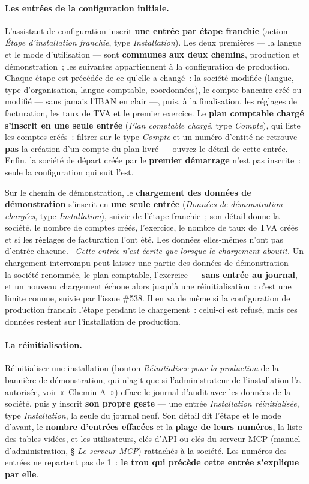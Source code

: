\documentclass[a4paper,11pt,oneside]{article}
\begin{document}
\paragraph{Les entrées de la configuration initiale.} L'assistant de
configuration inscrit \textbf{une entrée par étape franchie} (action
\emph{Étape d'installation franchie}, type \emph{Installation}). Les deux
premières --- la langue et le mode d'utilisation --- sont \textbf{communes aux deux
chemins}, production et démonstration~; les suivantes appartiennent à la
configuration de production. Chaque étape est précédée de ce qu'elle a changé~:
la société modifiée (langue, type d'organisation, langue comptable,
coordonnées), le compte bancaire créé ou modifié --- sans jamais l'IBAN en clair
---, puis, à la finalisation, les réglages de facturation, les taux de TVA et le
premier exercice. Le \textbf{plan comptable chargé s'inscrit en une seule entrée}
(\emph{Plan comptable chargé}, type \emph{Compte}), qui liste les comptes
créés~: filtrer sur le type \emph{Compte} et un numéro d'entité ne retrouve
\textbf{pas} la création d'un compte du plan livré --- ouvrez le détail de cette
entrée. Enfin, la société de départ créée par le \textbf{premier démarrage}
n'est pas inscrite~: seule la configuration qui suit l'est.

Sur le chemin de démonstration, le \textbf{chargement des données de
démonstration} s'inscrit en \textbf{une seule entrée} (\emph{Données de
démonstration chargées}, type \emph{Installation}), suivie de l'étape franchie~;
son détail donne la société, le nombre de comptes créés, l'exercice, le nombre de
taux de TVA créés et si les réglages de facturation l'ont été. Les données
elles-mêmes n'ont pas d'entrée chacune. \keshAttention\ \emph{Cette entrée n'est écrite que
lorsque le chargement aboutit.} Un chargement interrompu peut laisser une partie
des données de démonstration --- la société renommée, le plan comptable,
l'exercice --- \textbf{sans entrée au journal}, et un nouveau chargement échoue
alors jusqu'à une réinitialisation~: c'est une limite connue, suivie par
l'issue \#538. Il en va de même si la configuration de production franchit
l'étape pendant le chargement~: celui-ci est refusé, mais ces données restent sur
l'installation de production.

\paragraph{La réinitialisation.} Réinitialiser une installation (bouton
\emph{Réinitialiser pour la production} de la bannière de démonstration, qui n'agit
que si l'administrateur de l'installation l'a autorisée, voir «~Chemin A~») efface le
journal d'audit avec les données de la société, puis y inscrit \textbf{son propre
geste} --- une entrée \emph{Installation réinitialisée}, type \emph{Installation},
la seule du journal neuf. Son détail dit l'étape et le mode d'avant, le
\textbf{nombre d'entrées effacées} et la \textbf{plage de leurs numéros}, la liste des
tables vidées, et les utilisateurs, clés d'API ou clés du serveur MCP (manuel
d'administration, § \emph{Le serveur MCP}) rattachés à la société. Les numéros
des entrées ne repartent pas de 1~: \textbf{le trou qui précède cette entrée
s'explique par elle}.
\end{document}
